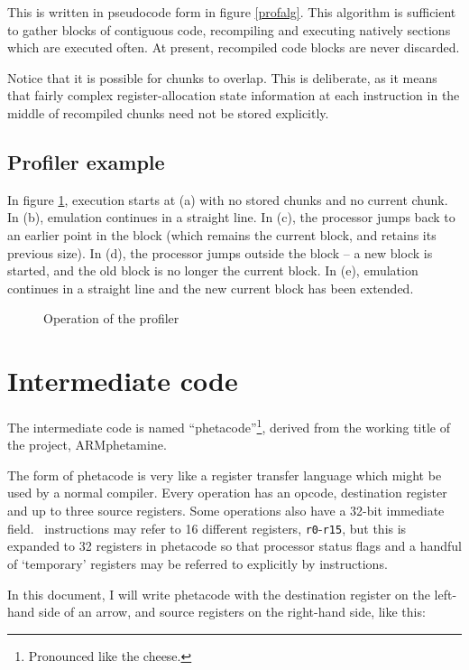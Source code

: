 This is written in pseudocode form in figure \ref{profalg}. This algorithm is sufficient to gather blocks of contiguous code, recompiling and executing natively sections which are executed often. At present, recompiled code blocks are never discarded.

Notice that it is possible for chunks to overlap. This is deliberate, as it means that fairly complex register-allocation state information at each instruction in the middle of recompiled chunks need not be stored explicitly.

\subsection{Profiler example}

In figure \ref{profilediag}, execution starts at (a) with no stored chunks and no current chunk. In (b), emulation continues in a straight line. In (c), the processor jumps back to an earlier point in the block (which remains the current block, and retains its previous size). In (d), the processor jumps outside the block -- a new block is started, and the old block is no longer the current block. In (e), emulation continues in a straight line and the new current block has been extended.

\begin{figure}[tbh]

\centerline{}

\caption{\label{profilediag}Operation of the profiler}
\end{figure}

\section{Intermediate code}

The intermediate code is named ``phetacode''\footnote{Pronounced like the cheese.}, derived from the working title of the project, ARMphetamine.

The form of phetacode is very like a register transfer language which might be used by a normal compiler. Every operation has an opcode, destination register and up to three source registers. Some operations also have a 32-bit immediate field. \arm\ instructions may refer to 16 different registers, {\tt r0}-{\tt r15}, but this is expanded to 32 registers in phetacode so that processor status flags and a handful of `temporary' registers may be referred to explicitly by instructions.

In this document, I will write phetacode with the destination register on the left-hand side of an arrow, and source registers on the right-hand side, like this:

